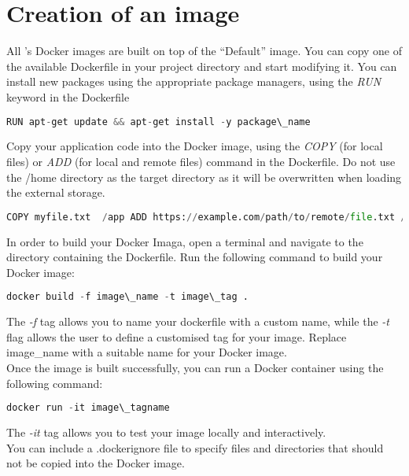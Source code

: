 \section{Creation of an image}\label{image_creation} All \uninuvola's Docker
images are built on top of the ``Default'' image. You can copy one of the
available  Dockerfile in your project directory and start modifying it. You can
install new packages using the appropriate package managers, using the
\textit{RUN} keyword in the Dockerfile

\begin{lstlisting}[language=python]
  RUN apt-get update && apt-get install -y package\_name
\end{lstlisting}

Copy your application code into the Docker image, using the \textit{COPY} (for
local files) or \textit{ADD} (for local and remote files) command in the
Dockerfile. Do not use the /home directory as the target directory as it will be
overwritten when loading the external storage.

\begin{lstlisting}[language=python]
  COPY myfile.txt  /app ADD https://example.com/path/to/remote/file.txt /app/
\end{lstlisting}

In order to build your Docker Imaga, open a terminal and navigate to the
directory containing the Dockerfile. Run the following command to build your
Docker image:

\begin{lstlisting}[language=python]
    docker build -f image\_name -t image\_tag .
\end{lstlisting}

The \textit{-f} tag allows you to name your dockerfile with a custom name, while
the \textit{-t}  flag allows the user to define a customised tag for your image.
Replace image\_name with a suitable name for your Docker image. \\

Once the image is built successfully, you can run a Docker container using the
following command:

\begin{lstlisting}[language=python]
    docker run -it image\_tagname 
\end{lstlisting}

The \textit{-it} tag allows you to test your image locally and interactively. \\

You can include a .dockerignore file to specify files and directories that
should not be copied into the Docker image.